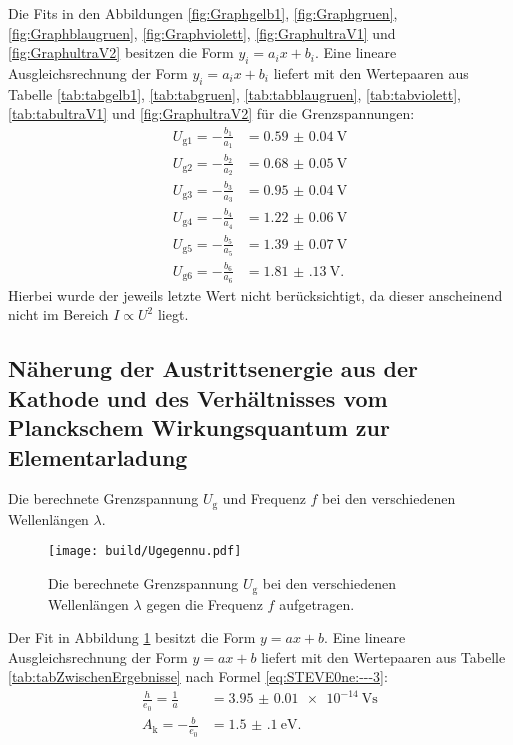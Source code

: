 Die Fits in den Abbildungen \ref{fig:Graphgelb1}, \ref{fig:Graphgruen}, \ref{fig:Graphblaugruen}, \ref{fig:Graphviolett}, \ref{fig:GraphultraV1} und \ref{fig:GraphultraV2} besitzen die Form $y_i=a_i x + b_i$. Eine lineare Ausgleichsrechnung der Form $y_i=a_i x+b_i$ liefert mit den Wertepaaren aus Tabelle \ref{tab:tabgelb1}, \ref{tab:tabgruen}, \ref{tab:tabblaugruen}, \ref{tab:tabviolett}, \ref{tab:tabultraV1} und \ref{fig:GraphultraV2} für die Grenzspannungen:
\begin{align}
	U_{\text{g}1} = -\frac{b_1}{a_1} &= \SI{0.59(4)}{\volt}\\
	U_{\text{g}2} = -\frac{b_2}{a_2} &= \SI{0.68(5)}{\volt}\\
	U_{\text{g}3} = -\frac{b_3}{a_3} &= \SI{0.95(4)}{\volt}\\
	U_{\text{g}4} = -\frac{b_4}{a_4} &= \SI{1.22(6)}{\volt}\\
	U_{\text{g}5} = -\frac{b_5}{a_5} &= \SI{1.39(7)}{\volt}\\
	U_{\text{g}6} = -\frac{b_6}{a_6} &= \SI{1.81(13)}{\volt}\text{.}
\end{align}
Hierbei wurde der jeweils letzte Wert nicht berücksichtigt, da dieser anscheinend nicht im Bereich $I\propto U^2$ liegt.

\subsection{Näherung der Austrittsenergie aus der Kathode und des Verhältnisses vom Planckschem Wirkungsquantum zur Elementarladung}
\begin{table}
	\centering
	\caption{Die berechnete Grenzspannung $U_\text{g}$ und Frequenz $f$ bei den verschiedenen Wellenlängen $\lambda$.}
  	
\end{table}
\begin{figure}
	\centering
	\caption{Die berechnete Grenzspannung $U_\text{g}$ bei den verschiedenen Wellenlängen $\lambda$ gegen die Frequenz $f$ aufgetragen.}
	\texttt{[image: build/Ugegennu.pdf]}
	\label{fig:GraphUgegennu}
\end{figure}
Der Fit in Abbildung \ref{fig:GraphUgegennu} besitzt die Form $y=a x + b$. Eine lineare Ausgleichsrechnung der Form $y=a x + b$ liefert mit den Wertepaaren aus Tabelle \ref{tab:tabZwischenErgebnisse} nach Formel \eqref{eq:STEVE0ne:---3}:
\begin{align}
	\frac{h}{e_0}=\frac{1}{a} &= \SI{3.95(1)e-14}{\volt\second}\\
	A_\text{k}=-\frac{b}{e_0} &= \SI{1.5(1)}{\electronvolt}\text{.}
\end{align}
 

